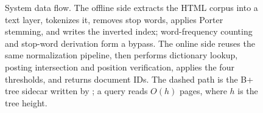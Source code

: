 \begin{figure}[!htbp]
{%
}
\caption{System data flow. The offline side extracts the HTML corpus into a
text layer, tokenizes it, removes stop words, applies Porter stemming, and
writes the inverted index; word-frequency counting and stop-word derivation
form a bypass. The online side reuses the same normalization pipeline, then
performs dictionary lookup, posting intersection and position verification,
applies the four thresholds, and returns document IDs. The dashed path is the
B+ tree sidecar written by ; a query reads $O(h)$ pages,
where $h$ is the tree height.}
\label{fig:pipeline}
\end{figure}
